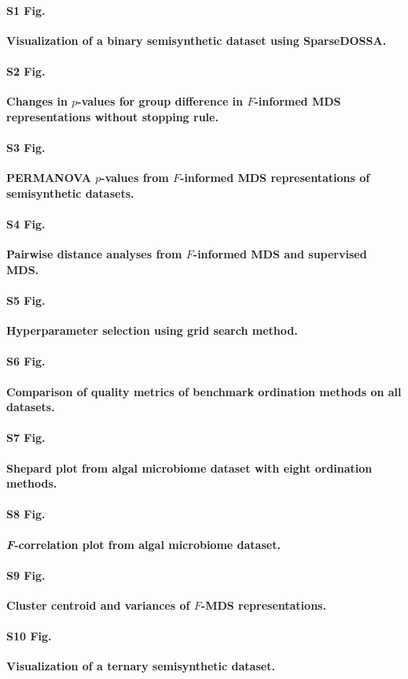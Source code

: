\documentclass[10pt,letterpaper]{article}
\newcommand{\1}{{\rm 1}\kern-0.24em{\rm I}}
\begin{document}
\paragraph*{S1 Fig.}
\label{fig:sim_data_vis}
{\bf Visualization of a binary semisynthetic dataset using SparseDOSSA.}

\paragraph*{S2 Fig.}
\label{fig:fmds_track_cont}
{\bf Changes in $p$-values for group difference in $F$-informed MDS representations without stopping rule.}

\paragraph*{S3 Fig.}
\label{fig:sim_fmds_track}
{\bf PERMANOVA $p$-values from $F$-informed MDS representations of semisynthetic datasets.}

\paragraph*{S4 Fig.}
\label{fig:sim_fmds_smds}
\textbf{Pairwise distance analyses from $F$-informed MDS and supervised MDS.}

\paragraph*{S5 Fig.}
\label{fig:fmds_gridsearch}
\textbf{Hyperparameter selection using grid search method.}

\paragraph*{S6 Fig.}
\label{fig:sim_eval_all}
\textbf{Comparison of quality metrics of benchmark ordination methods on all datasets.}

\paragraph*{S7 Fig.}
\label{fig:shepard_alga_all}
\textbf{Shepard plot from algal microbiome dataset with eight ordination methods.}

\paragraph*{S8 Fig.}
\label{fig:f_corr_alga_all}
\textbf{\textit{F}-correlation plot from algal microbiome dataset.}

\paragraph*{S9 Fig.}
\label{fig:fmds_rep_analysis}
\textbf{Cluster centroid and variances of $F$-MDS representations.} 

\paragraph*{S10 Fig.}
\label{fig:sim_ternary_vis}
\textbf{Visualization of a ternary semisynthetic dataset.}
\end{document}

